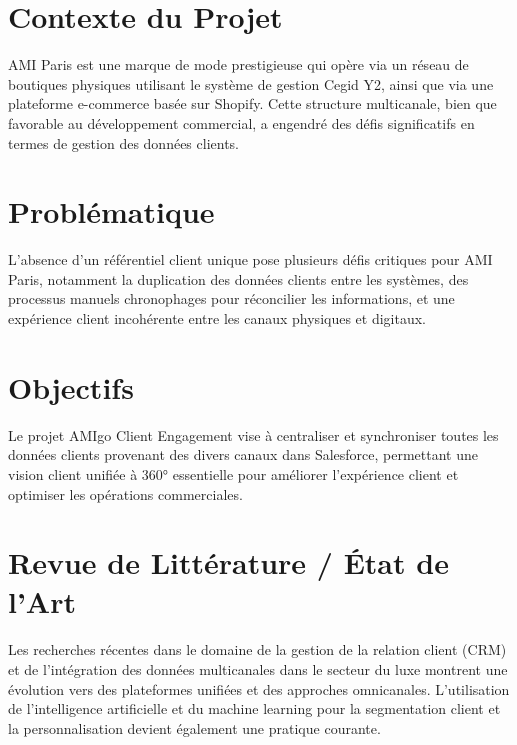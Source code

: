 \documentclass[12pt,a4paper,openany,oneside,draft]{report}
\begin{document}
\section{Contexte du Projet}
AMI Paris est une marque de mode prestigieuse qui opère via un réseau de boutiques physiques utilisant le système de gestion Cegid Y2, ainsi que via une plateforme e-commerce basée sur Shopify. Cette structure multicanale, bien que favorable au développement commercial, a engendré des défis significatifs en termes de gestion des données clients.

\section{Problématique}
\begin{mdframed}[backgroundcolor=lightgreen!20, linewidth=1pt]
L'absence d'un référentiel client unique pose plusieurs défis critiques pour AMI Paris, notamment la duplication des données clients entre les systèmes, des processus manuels chronophages pour réconcilier les informations, et une expérience client incohérente entre les canaux physiques et digitaux.
\end{mdframed}

\section{Objectifs}
Le projet AMIgo Client Engagement vise à centraliser et synchroniser toutes les données clients provenant des divers canaux dans Salesforce, permettant une vision client unifiée à 360° essentielle pour améliorer l'expérience client et optimiser les opérations commerciales.

\section{Revue de Littérature / État de l'Art}
Les recherches récentes dans le domaine de la gestion de la relation client (CRM) et de l'intégration des données multicanales dans le secteur du luxe montrent une évolution vers des plateformes unifiées et des approches omnicanales. L'utilisation de l'intelligence artificielle et du machine learning pour la segmentation client et la personnalisation devient également une pratique courante.
\end{document}

